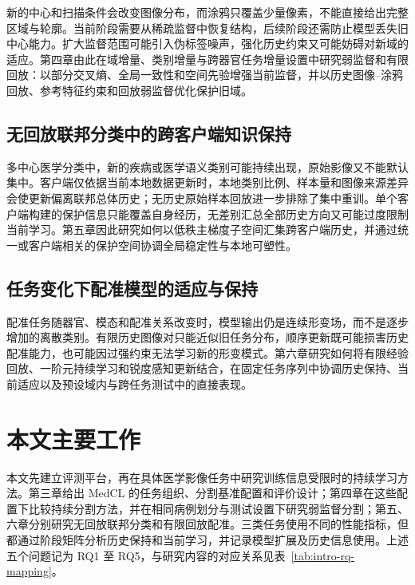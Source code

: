 新的中心和扫描条件会改变图像分布，而涂鸦只覆盖少量像素，不能直接给出完整区域与轮廓。当前阶段需要从稀疏监督中恢复结构，后续阶段还需防止模型丢失旧中心能力。扩大监督范围可能引入伪标签噪声，强化历史约束又可能妨碍对新域的适应。第四章由此在域增量、类别增量与跨器官任务增量设置中研究弱监督和有限回放：以部分交叉熵、全局一致性和空间先验增强当前监督，并以历史图像--涂鸦回放、参考特征约束和回放弱监督优化保护旧域。

\subsection{无回放联邦分类中的跨客户端知识保持}
\label{subsec:intro-challenge-fedsubmerge}

多中心医学分类中，新的疾病或医学语义类别可能持续出现，原始影像又不能默认集中。客户端仅依据当前本地数据更新时，本地类别比例、样本量和图像来源差异会使更新偏离联邦总体历史；无历史原始样本回放进一步排除了集中重训。单个客户端构建的保护信息只能覆盖自身经历，无差别汇总全部历史方向又可能过度限制当前学习。第五章因此研究如何以低秩主梯度子空间汇集跨客户端历史，并通过统一或客户端相关的保护空间协调全局稳定性与本地可塑性。

\subsection{任务变化下配准模型的适应与保持}
\label{subsec:intro-challenge-samcl}

配准任务随器官、模态和配准关系改变时，模型输出仍是连续形变场，而不是逐步增加的离散类别。有限历史图像对只能近似旧任务分布，顺序更新既可能损害历史配准能力，也可能因过强约束无法学习新的形变模式。第六章研究如何将有限经验回放、一阶元持续学习和锐度感知更新结合，在固定任务序列中协调历史保持、当前适应以及预设域内与跨任务测试中的直接表现。


\section{本文主要工作}
\label{sec:intro-research-content}

本文先建立评测平台，再在具体医学影像任务中研究训练信息受限时的持续学习方法。第三章给出 MedCL 的任务组织、分割基准配置和评价设计；第四章在这些配置下比较持续分割方法，并在相同病例划分与测试设置下研究弱监督分割；第五、六章分别研究无回放联邦分类和有限回放配准。三类任务使用不同的性能指标，但都通过阶段矩阵分析历史保持和当前学习，并记录模型扩展及历史信息使用。上述五个问题记为 RQ1 至 RQ5，与研究内容的对应关系见表~\ref{tab:intro-rq-mapping}。

